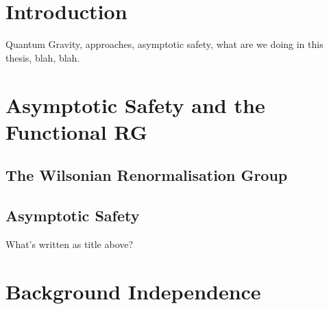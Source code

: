 \documentclass[11pt]{book} %
\numberwithin{equation}{chapter}
\begin{document}

\pagestyle{empty} %

\tableofcontents %

\pagestyle{fancy} %



\chapter*{Introduction}

Quantum Gravity, approaches, asymptotic safety, what are we doing in this thesis, blah, blah.


\mainmatter
\chapter[Asymptotic Safety and the Functional Renormalisation Group]{Asymptotic Safety and the Functional RG}

\section{The Wilsonian Renormalisation Group}
\section{Asymptotic Safety}
\newpage
What's written as title above?



\chapter{Background Independence}
\end{document}
